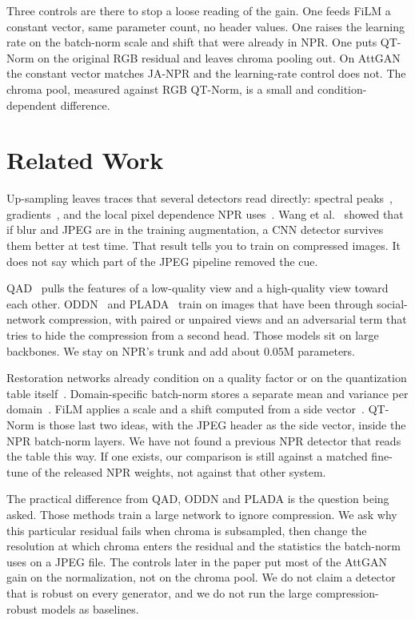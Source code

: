\documentclass[conference]{IEEEtran}
\begin{document}
Three controls are there to stop a loose reading of the gain. One feeds FiLM a constant vector, same parameter count, no header values. One raises the learning rate on the batch-norm scale and shift that were already in NPR. One puts QT-Norm on the original RGB residual and leaves chroma pooling out. On AttGAN the constant vector matches JA-NPR and the learning-rate control does not. The chroma pool, measured against RGB QT-Norm, is a small and condition-dependent difference.

\section{Related Work}
Up-sampling leaves traces that several detectors read directly: spectral peaks~\cite{frank2020frequency}, gradients~\cite{tan2023lgrad}, and the local pixel dependence NPR uses~\cite{tan2024npr}. Wang et al.~\cite{wang2020cnndetection} showed that if blur and JPEG are in the training augmentation, a CNN detector survives them better at test time. That result tells you to train on compressed images. It does not say which part of the JPEG pipeline removed the cue.

QAD~\cite{le2023qad} pulls the features of a low-quality view and a high-quality view toward each other. ODDN~\cite{tao2025oddn} and PLADA~\cite{li2025plada} train on images that have been through social-network compression, with paired or unpaired views and an adversarial term that tries to hide the compression from a second head. Those models sit on large backbones. We stay on NPR's trunk and add about 0.05M parameters.

Restoration networks already condition on a quality factor or on the quantization table itself~\cite{jiang2021fbcnn,ehrlich2020qgac}. Domain-specific batch-norm stores a separate mean and variance per domain~\cite{chang2019dsbn}. FiLM applies a scale and a shift computed from a side vector~\cite{perez2018film}. QT-Norm is those last two ideas, with the JPEG header as the side vector, inside the NPR batch-norm layers. We have not found a previous NPR detector that reads the table this way. If one exists, our comparison is still against a matched fine-tune of the released NPR weights, not against that other system.

The practical difference from QAD, ODDN and PLADA is the question being asked. Those methods train a large network to ignore compression. We ask why this particular residual fails when chroma is subsampled, then change the resolution at which chroma enters the residual and the statistics the batch-norm uses on a JPEG file. The controls later in the paper put most of the AttGAN gain on the normalization, not on the chroma pool. We do not claim a detector that is robust on every generator, and we do not run the large compression-robust models as baselines.
\end{document}
